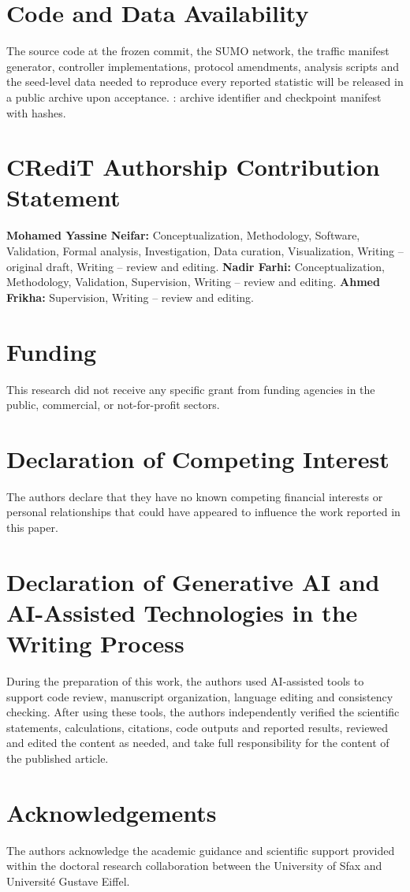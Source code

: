 \documentclass[review,12pt]{elsarticle}
\newcommand{\TBD}[1]{\textcolor{red}{\texttt{\detokenize{#1}}}}
\begin{document}
\section*{Code and Data Availability}
The source code at the frozen commit, the SUMO network, the traffic
manifest generator, controller implementations, protocol amendments,
analysis scripts and the seed-level data needed to reproduce every
reported statistic will be released in a public archive upon
acceptance. \TBD{TBD_AFTER_FINAL_EVALUATION}: archive identifier and
checkpoint manifest with hashes.

\section*{CRediT Authorship Contribution Statement}
\textbf{Mohamed Yassine Neifar:} Conceptualization, Methodology, Software, Validation, Formal analysis, Investigation, Data curation, Visualization, Writing -- original draft, Writing -- review and editing.
\textbf{Nadir Farhi:} Conceptualization, Methodology, Validation, Supervision, Writing -- review and editing.
\textbf{Ahmed Frikha:} Supervision, Writing -- review and editing.

\section*{Funding}
This research did not receive any specific grant from funding agencies in the public, commercial, or not-for-profit sectors.

\section*{Declaration of Competing Interest}
The authors declare that they have no known competing financial interests or personal relationships that could have appeared to influence the work reported in this paper.

\section*{Declaration of Generative AI and AI-Assisted Technologies in the Writing Process}
During the preparation of this work, the authors used AI-assisted tools
to support code review, manuscript organization, language editing and
consistency checking. After using these tools, the authors
independently verified the scientific statements, calculations,
citations, code outputs and reported results, reviewed and edited the
content as needed, and take full responsibility for the content of the
published article.

\section*{Acknowledgements}
The authors acknowledge the academic guidance and scientific support provided within the doctoral research collaboration between the University of Sfax and Universit\'e Gustave Eiffel.



\end{document}
